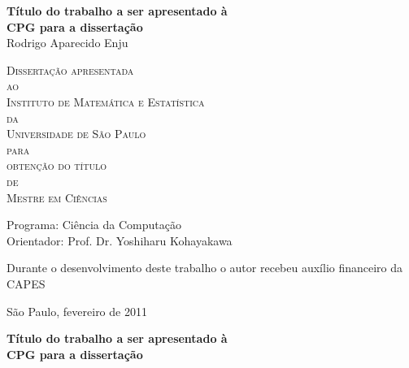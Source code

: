 \documentclass[11pt,twoside,a4paper]{book}
\newif\ifveroriginal
\newcommand{\formattedtitle}{Título do trabalho a ser apresentado à \\
    CPG para a dissertação}
\begin{document}
\frontmatter 
\fancyhead[RO]{{\footnotesize\rightmark}\hspace{2em}\thepage}
\setcounter{tocdepth}{2}
\fancyhead[LE]{\thepage\hspace{2em}\footnotesize{\leftmark}}
\fancyhead[RE,LO]{}
\fancyhead[RO]{{\footnotesize\rightmark}\hspace{2em}\thepage}

\onehalfspacing  %

\thispagestyle{empty}
\begin{center}
    \vspace*{2.3cm}
    \textbf{\Large{\formattedtitle}}\\
    
    \vspace*{1.2cm}
    \Large{Rodrigo Aparecido Enju}
    
    \vskip 2cm
    \textsc{
    Dissertação apresentada\\[-0.25cm] 
    ao\\[-0.25cm]
    Instituto de Matemática e Estatística\\[-0.25cm]
    da\\[-0.25cm]
    Universidade de São Paulo\\[-0.25cm]
    para\\[-0.25cm]
    obtenção do título\\[-0.25cm]
    de\\[-0.25cm]
    Mestre em Ciências}
    
    \vskip 1.5cm
    Programa: Ciência da Computação\\
    Orientador: Prof. Dr. Yoshiharu Kohayakawa

   	\vskip 1cm
    \normalsize{Durante o desenvolvimento deste trabalho o autor recebeu auxílio
    financeiro da CAPES}
    
    \vskip 0.5cm
    \normalsize{São Paulo, fevereiro de 2011}
\end{center}

%
%
%
\ifveroriginal
\newpage
\thispagestyle{empty}
    \begin{center}
        \vspace*{2.3 cm}
        \textbf{\Large{\formattedtitle}}\\
        \vspace*{2 cm}
    \end{center}
\end{document}
